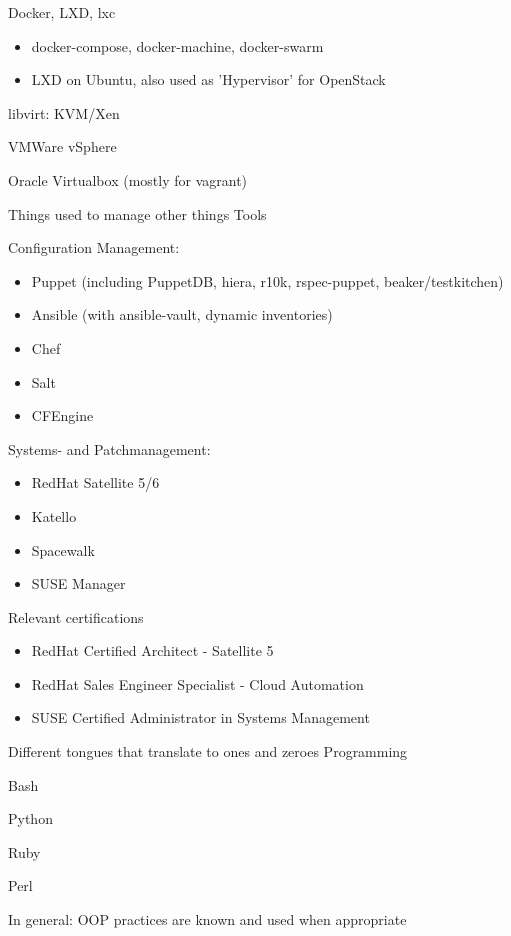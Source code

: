 \begin{cventries}
{\begin{cvitems}
        \item Docker, LXD, lxc
          \begin{itemize}
            \item docker-compose, docker-machine, docker-swarm
            \item LXD on Ubuntu, also used as 'Hypervisor' for OpenStack
          \end{itemize}
        \item libvirt: KVM/Xen
        \item VMWare vSphere
        \item Oracle Virtualbox (mostly for vagrant)
      \end{cvitems}
    }
  \cventry
    {Things used to manage other things}
    {Tools}
    {}
    {}
    {
      \begin{cvitems}
        \item Configuration Management:
          \begin{itemize}
            \item Puppet (including PuppetDB, hiera, r10k, rspec-puppet, beaker/testkitchen)
            \item Ansible (with ansible-vault, dynamic inventories)
            \item Chef
            \item Salt
            \item CFEngine
          \end{itemize}
        \item Systems- and Patchmanagement:
        \begin{itemize}
          \item RedHat Satellite 5/6
          \item Katello
          \item Spacewalk
          \item SUSE Manager
        \end{itemize}
        \item Relevant certifications
          \begin{itemize}
            \item RedHat Certified Architect - Satellite 5
            \item RedHat Sales Engineer Specialist - Cloud Automation
            \item SUSE Certified Administrator in Systems Management
          \end{itemize}
      \end{cvitems}
    }

  \cventry
    {Different tongues that translate to ones and zeroes}
    {Programming}
    {}
    {}
    {
      \begin{cvitems}
        \item Bash
        \item Python
        \item Ruby
        \item Perl
        \item In general: OOP practices are known and used when appropriate
      \end{cvitems}
    }

\end{cventries}


